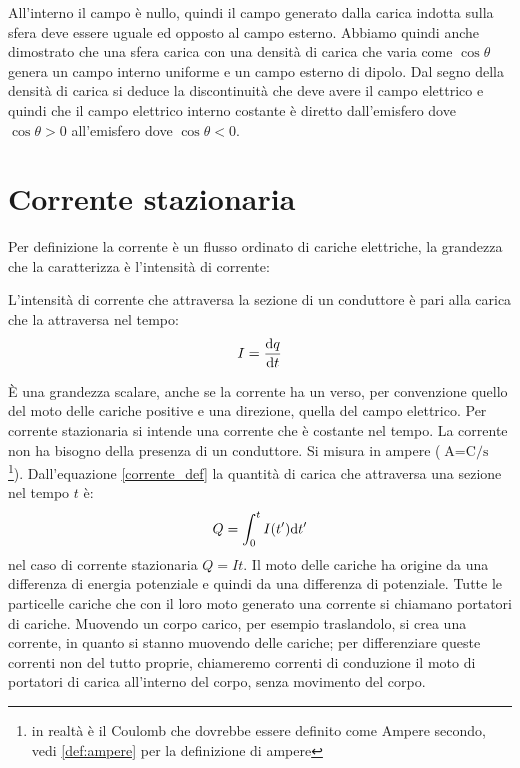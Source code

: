 \begin{Es}
  All'interno il campo è nullo, quindi il campo generato dalla carica indotta sulla sfera deve essere uguale ed opposto al campo esterno. Abbiamo quindi anche dimostrato che una sfera carica con una densità di carica che varia come $\cos\theta$ genera un campo interno uniforme e un campo esterno di dipolo. Dal segno della densità di carica si deduce la discontinuità che deve avere il campo elettrico e quindi che il campo elettrico interno costante è diretto dall'emisfero dove $\cos\theta>0$ all'emisfero dove $\cos\theta<0$.
\end{Es}


\chapter{Corrente stazionaria}
\minitoc
Per definizione la corrente è un flusso ordinato di cariche elettriche, la grandezza che la caratterizza è l'intensità di corrente:
\begin{Def}
  L'intensità di corrente che attraversa la sezione di un conduttore è pari alla carica che la attraversa nel tempo:
  \begin{equation}
    I=\frac{\mathrm{d} q}{\mathrm{d} t}
    \label{corrente_def}
  \end{equation}
\end{Def}
\`E una grandezza scalare, anche se la corrente ha un verso, per convenzione quello del moto delle cariche positive e una direzione, quella del campo elettrico. Per corrente stazionaria si intende una corrente che è costante nel tempo. La corrente non ha bisogno della presenza di un conduttore. Si misura in ampere ($\si{\ampere} = \si{\coulomb\per\second}$ \footnote{in realtà è il Coulomb che dovrebbe essere definito come Ampere secondo, vedi \ref{def:ampere} per la definizione di ampere}). Dall'equazione \eqref{corrente_def} la quantità di carica che attraversa una sezione nel tempo $t$ è:
\begin{equation}
  Q=\int_0^t I(t')\mathrm{d} t'
\end{equation}
nel caso di corrente stazionaria $Q=It$. Il moto delle cariche ha origine da una differenza di energia potenziale e quindi da una differenza di potenziale. Tutte le particelle cariche che con il loro moto generato una corrente si chiamano portatori di cariche. Muovendo un corpo carico, per esempio traslandolo, si crea una corrente, in quanto si stanno muovendo delle cariche; per differenziare queste correnti non del tutto proprie, chiameremo correnti di conduzione il moto di portatori di carica all'interno del corpo, senza movimento del corpo.
